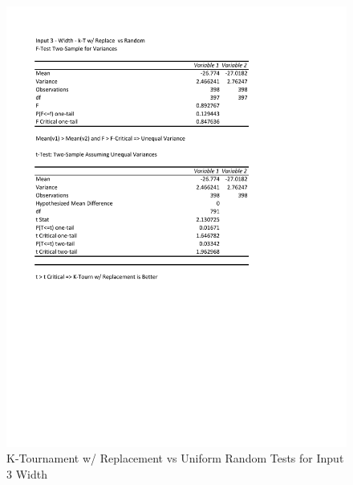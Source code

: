 \documentclass[times]{article}
\begin{document}
	\begin{figure}
		\caption{K-Tournament w/ Replacement vs Uniform Random Tests for Input 3 Width}
		\label{fig:3parent2_moea}
		\includegraphics[width=\textwidth]{./t_test/3_parent2_moea.pdf}
	\end{figure}
\end{document}
